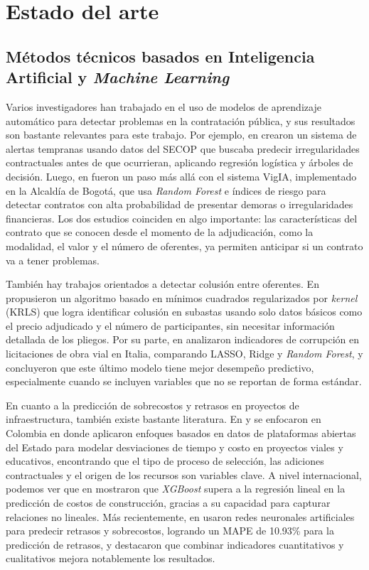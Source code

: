 \section{Estado del arte}

\subsection{Métodos técnicos basados en Inteligencia Artificial y \textit{Machine Learning}}

Varios investigadores han trabajado en el uso de modelos de aprendizaje automático para detectar problemas en la contratación pública, y sus resultados son bastante relevantes para este trabajo. Por ejemplo, en \cite{gallego2021preventing} crearon un sistema de alertas tempranas usando datos del SECOP que buscaba predecir irregularidades contractuales antes de que ocurrieran, aplicando regresión logística y árboles de decisión. Luego, en \cite{salazar2024vigia} fueron un paso más allá con el sistema VigIA, implementado en la Alcaldía de Bogotá, que usa \textit{Random Forest} e índices de riesgo para detectar contratos con alta probabilidad de presentar demoras o irregularidades financieras. Los dos estudios coinciden en algo importante: las características del contrato que se conocen desde el momento de la adjudicación, como la modalidad, el valor y el número de oferentes, ya permiten anticipar si un contrato va a tener problemas.

También hay trabajos orientados a detectar colusión entre oferentes. En  \cite{tas2024machine} propusieron un algoritmo basado en mínimos cuadrados regularizados por \textit{kernel} (KRLS) que logra identificar colusión en subastas usando solo datos básicos como el precio adjudicado y el número de participantes, sin necesitar información detallada de los pliegos. Por su parte, en \cite{decarolis2022corruption} analizaron indicadores de corrupción en licitaciones de obra vial en Italia, comparando LASSO, Ridge y \textit{Random Forest}, y concluyeron que este último modelo tiene mejor desempeño predictivo, especialmente cuando se incluyen variables que no se reportan de forma estándar.

En cuanto a la predicción de sobrecostos y retrasos en proyectos de infraestructura, también existe bastante literatura. En \cite{gomez2025data} y \cite{gomez2025analyzing} se enfocaron en Colombia en donde aplicaron enfoques basados en datos de plataformas abiertas del Estado para modelar desviaciones de tiempo y costo en proyectos viales y educativos, encontrando que el tipo de proceso de selección, las adiciones contractuales y el origen de los recursos son variables clave. A nivel internacional, podemos ver que en  \cite{alshboul2022extreme} mostraron que \textit{XGBoost} supera a la regresión lineal en la predicción de costos de construcción, gracias a su capacidad para capturar relaciones no lineales. Más recientemente, en \cite{galjanic2025neural} usaron redes neuronales artificiales para predecir retrasos y sobrecostos, logrando un MAPE de 10.93\% para la predicción de retrasos, y destacaron que combinar indicadores cuantitativos y cualitativos mejora notablemente los resultados.

